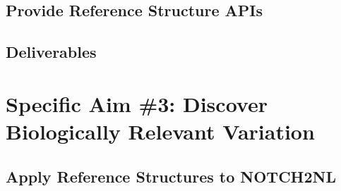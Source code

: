 \documentclass[11pt,proposal]{ucthesis}
\begin{document}
\subsection{Provide Reference Structure APIs}

\subsection{Deliverables} 


    
    
    
    
    
    

    

    


\section{Specific Aim \#3: Discover Biologically Relevant Variation}

\subsection{Apply Reference Structures to NOTCH2NL}
\end{document}

